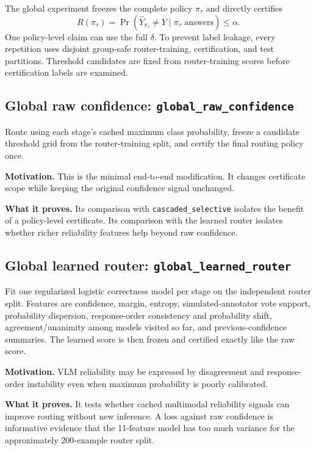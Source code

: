 \documentclass[10pt]{article}
\DeclareRobustCommand{\method}[1]{\nolinkurl{#1}}
\begin{document}
The global experiment freezes the complete policy $\pi_\tau$ and directly certifies
\[
R(\pi_\tau)=\Pr(\widehat{Y}_{\pi_\tau}\ne Y\mid\pi_\tau\text{ answers})\leq\alpha.
\]
One policy-level claim can use the full $\delta$. To prevent label leakage, every
repetition uses disjoint group-safe router-training, certification, and test partitions.
Threshold candidates are fixed from router-training scores before certification labels are
examined.

\subsection[Global raw confidence]{Global raw confidence: \method{global_raw_confidence}}

Route using each stage's cached maximum class probability, freeze a candidate threshold
grid from the router-training split, and certify the final routing policy once.

\textbf{Motivation.} This is the minimal end-to-end modification. It changes certificate
scope while keeping the original confidence signal unchanged.

\textbf{What it proves.} Its comparison with \method{cascaded_selective} isolates the
benefit of a policy-level certificate. Its comparison with the learned router isolates
whether richer reliability features help beyond raw confidence.

\subsection[Global learned router]{Global learned router: \method{global_learned_router}}

Fit one regularized logistic correctness model per stage on the independent router split.
Features are confidence, margin, entropy, simulated-annotator vote support, probability
dispersion, response-order consistency and probability shift, agreement/unanimity among
models visited so far, and previous-confidence summaries. The learned score is then frozen
and certified exactly like the raw score.

\textbf{Motivation.} VLM reliability may be expressed by disagreement and response-order
instability even when maximum probability is poorly calibrated.

\textbf{What it proves.} It tests whether cached multimodal reliability signals can improve
routing without new inference. A loss against raw confidence is informative evidence that
the 11-feature model has too much variance for the approximately 200-example router split.
\end{document}
